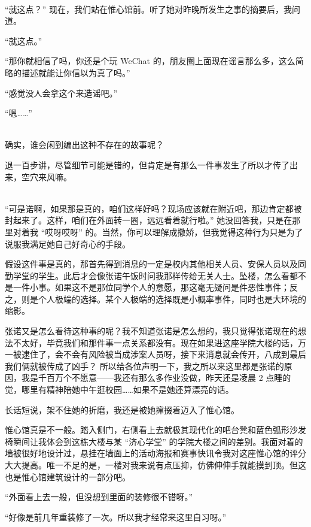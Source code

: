 \documentclass[UTF8]{ctexart}
\begin{document}
~\\

“就这点？” 现在，我们站在惟心馆前。听了她对昨晚所发生之事的摘要后，我问道。

“就这点。”

“那你就相信了吗，你还是个玩 WeChat 的，朋友圈上面现在谣言那么多，这么简略的描述就能让你信以为真了吗。”

“感觉没人会拿这个来造谣吧。”

“嗯……”

~\\

确实，谁会闲到编出这种不存在的故事呢？

退一百步讲，尽管细节可能是错的，但肯定是有那么一件事发生了所以才传了出来，空穴来风嘛。


~\\

“可是诺啊，如果那是真的，咱们这样好吗？现场应该就在附近吧，那边肯定都被封起来了。这样，咱们在外面转一圈，远远看着就行啦。” 她没回答我，只是在那里对着我 “哎呀哎呀” 的。当然，你可以理解成撒娇，但我觉得这种行为只是为了说服我满足她自己好奇心的手段。

假设这件事是真的，那首先得到消息的一定是校内其他相关人员、安保人员以及同勤学堂的学生。此后才会像张诺午饭时问我那样传给无关人士。坠楼，怎么看都不是一件小事。如果这不是那位同学个人的意愿，那这毫无疑问是件恶性事件；反之，则是个人极端的选择。某个人极端的选择既是小概率事件，同时也是大环境的缩影。

张诺又是怎么看待这种事的呢？我不知道张诺是怎么想的，我只觉得张诺现在的想法不太好，毕竟我们和那件事一点关系都没有。现在如果进这座学院大楼的话，万一被逮住了，会不会有风险被当成涉案人员呀，接下来消息就会传开，八成到最后我们俩就被传成了凶手？
所以给各位声明一下，我之所以来这里都是张诺的原因，我是千百万个不愿意——我还有那么多作业没做，昨天还是凌晨 2 点睡的觉，哪里有精神陪她中午逛校园……如果不是她还算漂亮的话。

长话短说，架不住她的折磨，我还是被她撺掇着迈入了惟心馆。

惟心馆真是不一般。踏入侧门，右侧看上去就极其现代化的吧台凳和蓝色弧形沙发椅瞬间让我体会到这栋大楼与某 “济心学堂” 的学院大楼之间的差别。我面对着的墙被很好地设计过，悬挂在墙面上的活动海报和赛事快讯令我对这座惟心馆的评分大大提高。唯一不足的是，一楼对我来说有点压抑，仿佛伸伸手就能摸到顶。但这也是惟心馆建筑设计的一部分吧。

“外面看上去一般，但没想到里面的装修很不错呀。”

“好像是前几年重装修了一次。所以我才经常来这里自习呀。”
\end{document}
